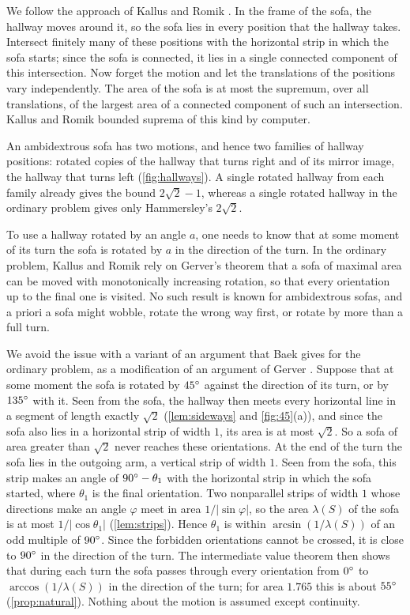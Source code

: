 We follow the approach of Kallus and Romik \cite{kallusromik2018}. In the frame of the sofa, the hallway moves around it, so the sofa lies in every position that the hallway takes. Intersect finitely many of these positions with the horizontal strip in which the sofa starts; since the sofa is connected, it lies in a single connected component of this intersection. Now forget the motion and let the translations of the positions vary independently. The area of the sofa is at most the supremum, over all translations, of the largest area of a connected component of such an intersection. Kallus and Romik bounded suprema of this kind by computer.

An ambidextrous sofa has two motions, and hence two families of hallway positions: rotated copies of the hallway that turns right and of its mirror image, the hallway that turns left (\cref{fig:hallways}). A single rotated hallway from each family already gives the bound $2\sqrt2-1$, whereas a single rotated hallway in the ordinary problem gives only Hammersley's $2\sqrt2$.

To use a hallway rotated by an angle $a$, one needs to know that at some moment of its turn the sofa is rotated by $a$ in the direction of the turn. In the ordinary problem, Kallus and Romik rely on Gerver's theorem \cite[Theorem~1]{gerver1992} that a sofa of maximal area can be moved with monotonically increasing rotation, so that every orientation up to the final one is visited. No such result is known for ambidextrous sofas, and a priori a sofa might wobble, rotate the wrong way first, or rotate by more than a full turn.

We avoid the issue with a variant of an argument that Baek \cite[Theorem~1.5.1]{baek2024} gives for the ordinary problem, as a modification of an argument of Gerver \cite[p.~271]{gerver1992}. Suppose that at some moment the sofa is rotated by $45^{\circ}$ against the direction of its turn, or by $135^{\circ}$ with it. Seen from the sofa, the hallway then meets every horizontal line in a segment of length exactly $\sqrt2$ (\cref{lem:sideways} and \cref{fig:45}(a)), and since the sofa also lies in a horizontal strip of width $1$, its area is at most $\sqrt2$. So a sofa of area greater than $\sqrt2$ never reaches these orientations. At the end of the turn the sofa lies in the outgoing arm, a vertical strip of width $1$. Seen from the sofa, this strip makes an angle of $90^{\circ}-\theta_1$ with the horizontal strip in which the sofa started, where $\theta_1$ is the final orientation. Two nonparallel strips of width $1$ whose directions make an angle $\varphi$ meet in area $1/|\sin\varphi|$, so the area $\lambda(S)$ of the sofa is at most $1/|\cos\theta_1|$ (\cref{lem:strips}). Hence $\theta_1$ is within $\arcsin(1/\lambda(S))$ of an odd multiple of $90^{\circ}$. Since the forbidden orientations cannot be crossed, it is close to $90^{\circ}$ in the direction of the turn. The intermediate value theorem then shows that during each turn the sofa passes through every orientation from $0^{\circ}$ to $\arccos(1/\lambda(S))$ in the direction of the turn; for area $1.765$ this is about $55^{\circ}$ (\cref{prop:natural}). Nothing about the motion is assumed except continuity.

